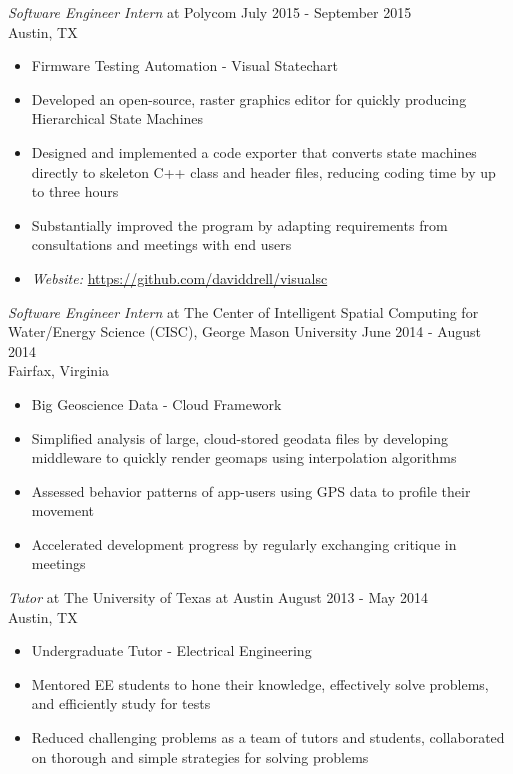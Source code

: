 \documentclass[line,margin]{res}
\begin{document}
\begin{resume}
                {\sl Software Engineer Intern} at Polycom \hfill            July 2015 - September 2015\\        
                Austin, TX 
                \begin{itemize}  \itemsep -2pt %
                  \item         Firmware Testing Automation - Visual Statechart 
                 \item Developed an open-source, raster graphics editor for quickly producing Hierarchical State Machines
                 \item Designed and implemented a code exporter that converts state machines directly to skeleton C++ class and header files, reducing coding time by up to three hours
                 \item Substantially improved the program by adapting requirements from consultations and meetings with end users
                 \item \textit{Website: }  \url{https://github.com/daviddrell/visualsc}
                 \end{itemize}

                 {\sl Software Engineer Intern} at The Center of Intelligent Spatial Computing for Water/Energy Science (CISC), George Mason University \hfill June 2014 - August 2014\\
                 Fairfax, Virginia
                 \begin{itemize}
                 \item Big Geoscience Data - Cloud Framework
                 \item Simplified analysis of large, cloud-stored geodata files by developing middleware to quickly render geomaps using interpolation algorithms
                 \item Assessed behavior patterns of app-users using GPS data to profile their movement
                 \item Accelerated development progress by regularly exchanging critique in meetings
                 \end{itemize}

                 {\sl Tutor} at The University of Texas at Austin \hfill August 2013 - May 2014\\
                 Austin, TX
                 \begin{itemize}
                 \item Undergraduate Tutor - Electrical Engineering
                 \item Mentored EE students to hone their knowledge, effectively solve problems, and efficiently study for tests
                 \item Reduced challenging problems as a team of tutors and students, collaborated on thorough and simple strategies for solving problems
                 \end{itemize}
 

\end{resume}
\end{document}
